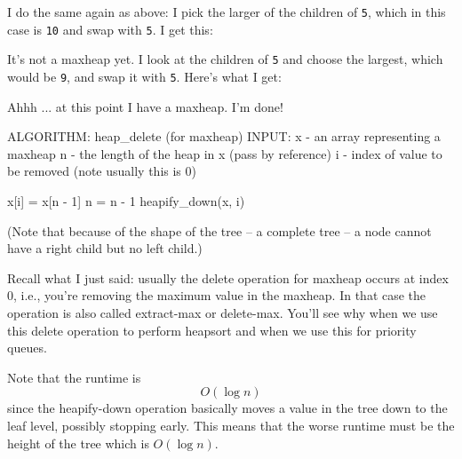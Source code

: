 I do the same again as above: I pick the larger of the children
of \texttt{5}, which in this case is \texttt{10} and swap with \texttt{5}.
I get this:



It's not a maxheap yet.
I look at the children of \texttt{5} and choose the largest,
which would be \texttt{9}, and swap it with \texttt{5}.
Here's what I get:



Ahhh ... at this point I have a maxheap.
I'm done!

\begin{console}[commandchars=\\\{\}]
ALGORITHM: heap_delete (for maxheap)
INPUT: x - an array representing a maxheap
       n - the length of the heap in x (pass by reference)
       i - index of value to be removed (note usually this is 0)

x[i] = x[n - 1]
n = n - 1
heapify_down(x, i)
\end{console}

(Note that because of the shape of the tree -- a complete tree --
a node cannot have a right child but no left child.)

Recall what I just said: usually the delete operation for maxheap
occurs at index 0, i.e., you're removing the maximum value in the maxheap.
In that case the operation is also called extract-max or delete-max.
You'll see why when we use this delete operation to perform heapsort
and when we use this for priority queues.

Note that the runtime is
\[
  O(\log n)
\]
since the heapify-down operation basically moves
a value in the tree down to the leaf level, possibly stopping
early.
This means that the worse runtime must be
the height of the tree which is $O(\log n)$.








%


%
%
%
